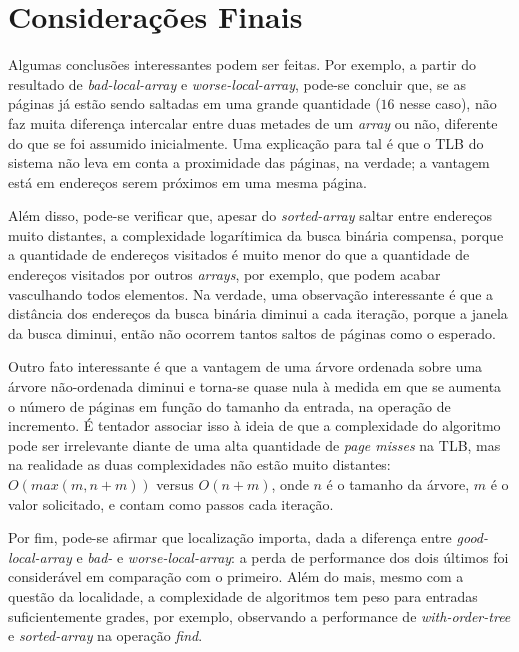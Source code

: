 \documentclass[a4paper]{article}
\begin{document}
\FloatBarrier

\section{Considerações Finais}

Algumas conclusões interessantes podem ser feitas. Por exemplo, a partir do
resultado de \textit{bad-local-array} e \textit{worse-local-array}, pode-se
concluir que, se as páginas já estão sendo saltadas em uma grande quantidade
($16$ nesse caso), não faz muita diferença intercalar entre duas metades de
um \textit{array} ou não, diferente do que se foi assumido inicialmente.
Uma explicação para tal é que o TLB do sistema não leva em conta a proximidade
das páginas, na verdade; a vantagem está em endereços serem próximos em uma
mesma página.

Além disso, pode-se verificar que, apesar do \textit{sorted-array} saltar entre
endereços muito distantes, a complexidade logarítimica da busca binária
compensa, porque a quantidade de endereços visitados é muito menor do que a
quantidade de endereços visitados por outros \textit{arrays}, por exemplo,
que podem acabar vasculhando todos elementos. Na verdade, uma observação
interessante é que a distância dos endereços da busca binária diminui a cada
iteração, porque a janela da busca diminui, então não ocorrem tantos saltos de
páginas como o esperado.

Outro fato interessante é que a vantagem de uma árvore ordenada sobre uma
árvore não-ordenada diminui e torna-se quase nula à medida em que se aumenta o
número de páginas em função do tamanho da entrada, na operação de incremento.
É tentador associar isso à ideia de que a complexidade do algoritmo pode ser
irrelevante diante de uma alta quantidade de \textit{page misses} na TLB, mas na
realidade as duas complexidades não estão muito distantes: $O(max(m, n+m))$ versus
$O(n + m)$, onde $n$ é o tamanho da árvore, $m$ é o valor solicitado, e contam
como passos cada iteração.

Por fim, pode-se afirmar que localização importa, dada a diferença entre
\textit{good-local-array} e \textit{bad-} e \textit{worse-local-array}: a perda
de performance dos dois últimos foi considerável em comparação com o primeiro.
Além do mais, mesmo com a questão da localidade, a complexidade de algoritmos
tem peso para entradas suficientemente grades, por exemplo, observando a
performance de \textit{with-order-tree} e \textit{sorted-array} na operação
\textit{find}.

\nocite{*}
\printbibliography
\end{document}
